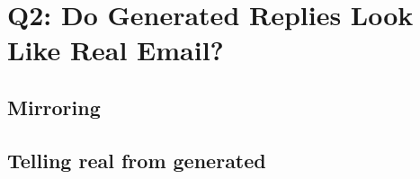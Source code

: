 \chapter{Q2: Do Generated Replies Look Like Real Email?}
\label{ch:q2}


\section{Mirroring}


\section{Telling real from generated}




